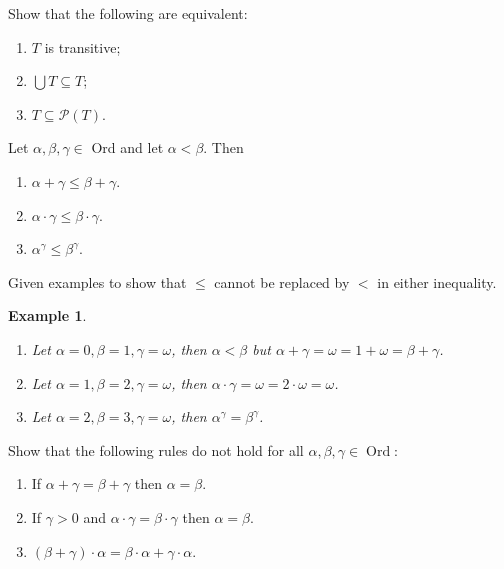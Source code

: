 \documentclass{ctexart}
\DeclareMathOperator{\ord}{Ord}
\newtheorem{example}{Example}
\begin{document}
\begin{problem}
Show that the following are equivalent:
\begin{enumerate}[ref=\theproblem.\arabic*]
\item\label{it:1} $T$ is transitive;
\item\label{it:2}$\bigcup T \subseteq T$;
\item\label{it:3} $T \subseteq \mathscr{P}(T)$.
\end{enumerate}
\end{problem}


\begin{problem}
Let $\alpha, \beta, \gamma \in$ Ord and let $\alpha<\beta$. Then
\begin{enumerate}[label=\alph*,ref=\theproblem.\alph*]
\item\label{it:11} $\alpha+\gamma \leq \beta+\gamma$.
\item\label{it:12} $\alpha \cdot \gamma \leq \beta \cdot \gamma$.
\item\label{it:13} $\alpha^\gamma \leq \beta^\gamma$.
\end{enumerate}
Given examples to show that $\leq$ cannot be replaced by $<$ in either inequality.
\end{problem}

\begin{example}
\begin{enumerate}[label=\alph*,ref=Example\theexample.\alph*]
\item\label{it:71} Let $\alpha=0,\beta=1,\gamma=\omega$, then $\alpha<\beta$ but $\alpha+\gamma=\omega=1+\omega=\beta+\gamma$.
\item\label{it:72} Let $\alpha=1,\beta=2,\gamma=\omega$, then $\alpha\cdot \gamma=\omega=2\cdot\omega =\omega$.
\item\label{it:73}  Let $\alpha=2,\beta=3,\gamma=\omega$, then $\alpha^\gamma=\beta^\gamma$.
\end{enumerate}
\end{example}

\begin{problem}
Show that the following rules do not hold for all $\alpha, \beta, \gamma \in\ord$:
\begin{enumerate}[label=\alph*,ref=\theproblem.\alph*]
\item If $\alpha+\gamma=\beta+\gamma$ then $\alpha=\beta$.
\item If $\gamma>0$ and $\alpha \cdot \gamma=\beta \cdot \gamma$ then $\alpha=\beta$.
\item $(\beta+\gamma) \cdot \alpha=\beta \cdot \alpha+\gamma \cdot \alpha$.
\end{enumerate}
\end{problem}
\end{document}
